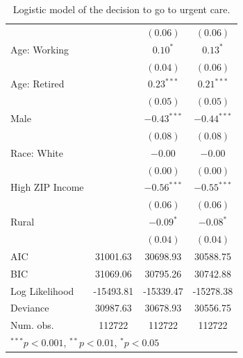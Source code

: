\documentclass[12pt,twoside]{reedthesis}
\begin{document}
\begin{table}
\begin{center}
\begin{footnotesize}
\begin{tabular}{l c c c }
                                &               & $(0.06)$      & $(0.06)$      \\
  Age: Working                  &               & $0.10^{*}$    & $0.13^{*}$    \\
                                &               & $(0.04)$      & $(0.06)$      \\
  Age: Retired                  &               & $0.23^{***}$  & $0.21^{***}$  \\
                                &               & $(0.05)$      & $(0.05)$      \\
  Male                          &               & $-0.43^{***}$ & $-0.44^{***}$ \\
                                &               & $(0.08)$      & $(0.08)$      \\
  Race: White                   &               & $-0.00$       & $-0.00$       \\
                                &               & $(0.00)$      & $(0.00)$      \\
  High ZIP Income               &               & $-0.56^{***}$ & $-0.55^{***}$ \\
                                &               & $(0.06)$      & $(0.06)$      \\
  Rural                         &               & $-0.09^{*}$   & $-0.08^{*}$   \\
                                &               & $(0.04)$      & $(0.04)$      \\
  \hline
  AIC                           & 31001.63      & 30698.93      & 30588.75      \\
  BIC                           & 31069.06      & 30795.26      & 30742.88      \\
  Log Likelihood                & -15493.81     & -15339.47     & -15278.38     \\
  Deviance                      & 30987.63      & 30678.93      & 30556.75      \\
  Num. obs.                     & 112722        & 112722        & 112722        \\
  \hline
  \multicolumn{4}{l}{\tiny{$^{***}p<0.001$, $^{**}p<0.01$, $^*p<0.05$}}
  \end{tabular}
  \end{footnotesize}
  \caption{Logistic model of the decision to go to urgent care.}
  \label{table:coefficients}
  \end{center}
  \end{table}
  
\end{document}
